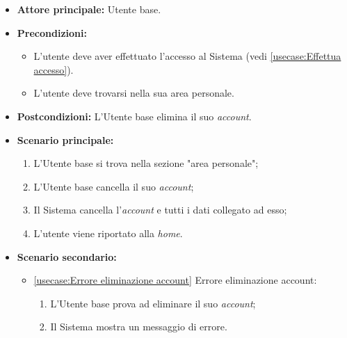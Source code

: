 \label{usecase:Elimina account}
\begin{itemize}
	\item \textbf{Attore principale:} Utente base.

	\item \textbf{Precondizioni:}
	\begin{itemize}
        \item L'utente deve aver effettuato l'accesso al Sistema (vedi \autoref{usecase:Effettua accesso}).
        \item L'utente deve trovarsi nella sua area personale.
    \end{itemize}

	\item \textbf{Postcondizioni:} L'Utente base elimina il suo \textit{account}.

	\item \textbf{Scenario principale:}
	      \begin{enumerate}
		      \item L'Utente base si trova nella sezione "area personale";
		      \item L'Utente base cancella il suo \textit{account};
              \item Il Sistema cancella l'\textit{account} e tutti i dati collegato ad esso;
              \item L'utente viene riportato alla \textit{home}.
	      \end{enumerate}
	\item \textbf{Scenario secondario:}
		  \begin{itemize}
			  \item \autoref{usecase:Errore eliminazione account} Errore eliminazione account:
				\begin{enumerate}
					\item L'Utente base prova ad eliminare il suo \textit{account};
					\item Il Sistema mostra un messaggio di errore.
				\end{enumerate}
		  \end{itemize}
\end{itemize}
